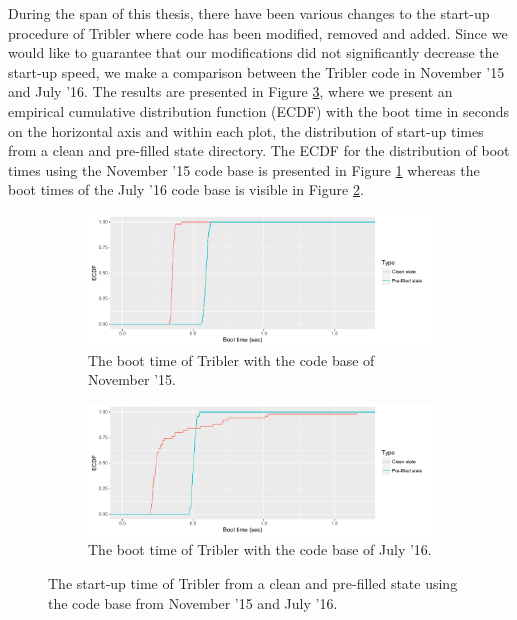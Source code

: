 During the span of this thesis, there have been various changes to the start-up procedure of Tribler where code has been modified, removed and added. Since we would like to guarantee that our modifications did not significantly decrease the start-up speed, we make a comparison between the Tribler code in November '15 and July '16. The results are presented in Figure \ref{fig:startup-experiment}, where we present an empirical cumulative distribution function (ECDF) with the boot time in seconds on the horizontal axis and within each plot, the distribution of start-up times from a clean and pre-filled state directory. The ECDF for the distribution of boot times using the November '15 code base is presented in Figure \ref{fig:startup-time-2015} whereas the boot times of the July '16 code base is visible in Figure \ref{fig:startup-time-2016}.\\

\begin{figure}[h!]
	\centering
	\begin{subfigure}[b]{1\textwidth}
		\includegraphics[width=1\linewidth]{images/experiments/startup_time_2015}
		\caption{The boot time of Tribler with the code base of November '15.}
		\label{fig:startup-time-2015} 
	\end{subfigure}
	
	\begin{subfigure}[b]{1\textwidth}
		\includegraphics[width=1\linewidth]{images/experiments/startup_time_2016}
		\caption{The boot time of Tribler with the code base of July '16.}
		\label{fig:startup-time-2016}
	\end{subfigure}
	
	\caption{The start-up time of Tribler from a clean and pre-filled state using the code base from November '15 and July '16.}
	\label{fig:startup-experiment}
\end{figure}

